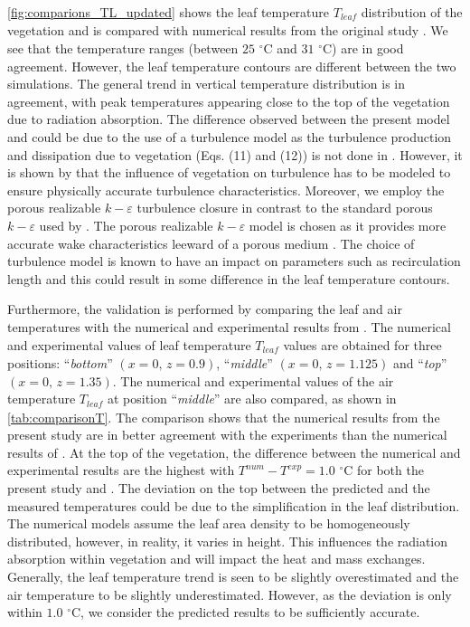 \cref{fig:comparions_TL_updated} shows the leaf temperature $T_{\mathit{leaf}}$ distribution of the vegetation and is compared with numerical results from the original study \citep{Kichah2012}. We see that the temperature ranges (between $25$ $^{\circ}$C and $31$ $^{\circ}$C) are in good agreement. However, the leaf temperature contours are different between the two simulations. The general trend in vertical temperature distribution is in agreement, with peak temperatures appearing close to the top of the vegetation due to radiation absorption. The difference observed between the present model and \cite{Kichah2012} could be due to the use of a turbulence model as the turbulence production and dissipation due to vegetation (Eqs. (11) and (12)) is not done in \cite{Kichah2012}. However, it is shown by \cite{Sanz2003} that the influence of vegetation on turbulence has to be modeled to ensure physically accurate turbulence characteristics. Moreover, we employ the porous realizable $k-\varepsilon$ turbulence closure in contrast to the standard porous $k-\varepsilon$ used by \cite{Kichah2012}. The porous realizable $k-\varepsilon$ model is chosen as it provides more accurate wake characteristics leeward of a porous medium \citep{Santiago2007, Shih1995}. The choice of turbulence model is known to have an impact on parameters such as recirculation length \citep{Santiago2007} and this could result in some difference in the leaf temperature contours. 

Furthermore, the validation is performed by comparing the leaf and air temperatures with the numerical and experimental results from \cite{Kichah2012}. The numerical and experimental values of leaf temperature $T_{\mathit{leaf}}$ values are obtained for three positions: ``\textit{bottom}'' $(x=0,\,z=0.9)$, ``\textit{middle}'' $(x=0,\,z=1.125)$ and ``\textit{top}'' $(x=0,\,z=1.35)$. The numerical and experimental values of the air temperature $T_{\mathit{leaf}}$ at position ``\textit{middle}'' are also compared, as shown in \cref{tab:comparisonT}. The comparison shows that the numerical results from the present study are in better agreement with the experiments than the numerical results of \cite{Kichah2012}. At the top of the vegetation, the difference between the numerical and experimental results are the highest with $T^{\mathit{num}}-T^{\mathit{exp}}=1.0$ $^{\circ}$C for both the present study and  \cite{Kichah2012}. The deviation on the top between the predicted and the measured temperatures could be due to the simplification in the leaf distribution. The numerical models assume the leaf area density to be homogeneously distributed, however, in reality, it varies in height. This influences the radiation absorption within vegetation and will impact the heat and mass exchanges. Generally, the leaf temperature trend is seen to be slightly overestimated and the air temperature to be slightly underestimated. However, as the deviation is only within $1.0$ $^{\circ}$C, we consider the predicted results to be sufficiently accurate.  

